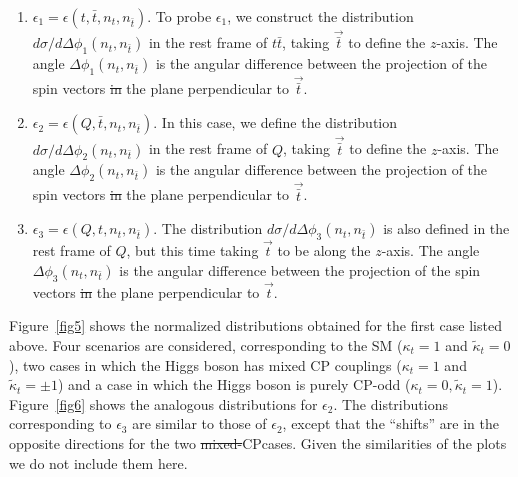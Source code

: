 \documentclass[aps,preprint,tightenlines,floatfix,superscriptaddress,nofootinbib,showpacs]{revtex4-1}
\def\tbar{\bar{t}}
\def\kp{\kappa_t}
\def\kpt{\tilde{\kappa}_t}
\def\TPa{\epsilon(t,\tbar,n_t,n_{\tbar})}
\def\TPb{\epsilon(Q,\tbar,n_t,n_{\tbar})}
\def\TPc{\epsilon(Q,t,n_t,n_{\tbar})}
\providecommand{\DIFadd}[1]{{\protect\color{blue}\uwave{#1}}} %
\providecommand{\DIFdel}[1]{{\protect\color{red}\sout{#1}}}                      %
\providecommand{\DIFaddbegin}{} %
\providecommand{\DIFaddend}{} %
\providecommand{\DIFdelbegin}{} %
\providecommand{\DIFdelend}{} %
\begin{document}
 \begin{enumerate} 
\item {\boldmath $\epsilon_1 = \TPa$.}  To probe $\epsilon_1$, we construct
  the distribution
  $d\sigma/d\Delta\phi_1(n_t,n_{\tbar})$ in the rest frame of $t\tbar$,
  taking $\vec{\tbar}$ to define the $z$-axis. The angle
  $\Delta\phi_1(n_t,n_{\tbar})$ is the angular difference between the
  projection of the spin vectors \DIFdelbegin \DIFdel{in }\DIFdelend \DIFaddbegin \DIFadd{onto }\DIFaddend the plane perpendicular to
  $\vec{\tbar}$.
\item {\boldmath $\epsilon_2 = \TPb$.}  In this case, we
  define the distribution
  $d\sigma/d\Delta\phi_2(n_t,n_{\tbar})$ in the rest frame of $Q$, taking
  $\vec{\tbar}$ to define the $z$-axis. The angle
  $\Delta\phi_2(n_t,n_{\tbar})$ is the angular difference between the
  projection of the spin vectors \DIFdelbegin \DIFdel{in }\DIFdelend \DIFaddbegin \DIFadd{onto }\DIFaddend the plane perpendicular to
  $\vec{\tbar}$.
\item {\boldmath $\epsilon_3 = \TPc$.}  The distribution
  $d\sigma/d\Delta\phi_3(n_t,n_{\tbar})$ is also defined
  in the rest frame of $Q$, but this time taking
  $\vec{t}$ to be along the $z$-axis. The angle $\Delta\phi_3(n_t,n_{\tbar})$
  is the angular difference between the projection of the spin vectors
  \DIFdelbegin \DIFdel{in }\DIFdelend \DIFaddbegin \DIFadd{onto }\DIFaddend the plane perpendicular to $\vec{t}$.
 \end{enumerate} 
\par
%
Figure~\ref{fig5} shows the normalized distributions obtained
for the first case listed above.
Four scenarios are considered, corresponding to the SM
($\kp= 1$ and $\kpt=0$), two cases in which the Higgs boson
has mixed $\mathrm{CP}$ couplings ($\kp= 1$ and $\kpt=\pm 1$)
and a case in which the Higgs boson is purely 
$\mathrm{CP}$-odd ($\kp= 0,\kpt=1$). Figure~\ref{fig6} shows
the analogous distributions for $\epsilon_2$. The distributions
corresponding to $\epsilon_3$ are similar to those of $\epsilon_2$,
except that the ``shifts'' are in the opposite directions for
the two \DIFdelbegin \DIFdel{mixed-}\DIFdelend $\mathrm{CP}$\DIFaddbegin \DIFadd{-mixed }\DIFaddend cases.  Given the similarities of the
plots we do not include them here. 
\end{document}

